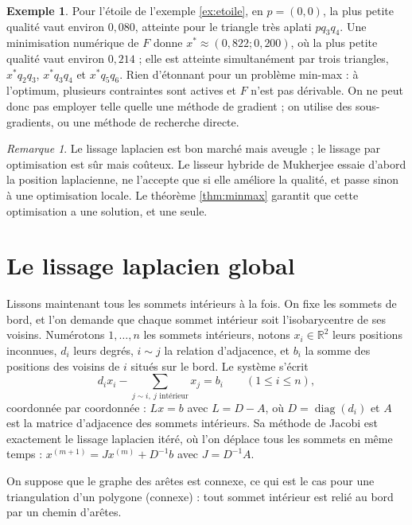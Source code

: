 \documentclass[11pt,a4paper]{article}
\theoremstyle{plain}
\theoremstyle{definition}
\newtheorem{exemple}[theoreme]{Exemple}
\theoremstyle{remark}
\newtheorem{remarque}[theoreme]{Remarque}
\newcommand{\R}{\mathbb{R}}
\begin{document}
\begin{exemple}\label{ex:minmax}
Pour l'étoile de l'exemple \ref{ex:etoile}, en $p=(0,0)$, la plus petite qualité vaut environ $0{,}080$, atteinte pour le triangle très aplati $pq_3q_4$. Une minimisation numérique de $F$ donne $x^*\approx(0{,}822;0{,}200)$, où la plus petite qualité vaut environ $0{,}214$ ; elle est atteinte simultanément par trois triangles, $x^*q_2q_3$, $x^*q_3q_4$ et $x^*q_5q_6$. Rien d'étonnant pour un problème min-max : à l'optimum, plusieurs contraintes sont actives et $F$ n'est pas dérivable. On ne peut donc pas employer telle quelle une méthode de gradient ; on utilise des sous-gradients, ou une méthode de recherche directe.
\end{exemple}

\begin{remarque}
Le lissage laplacien est bon marché mais aveugle ; le lissage par optimisation est sûr mais coûteux. Le lisseur hybride de Mukherjee \cite{mukherjee} essaie d'abord la position laplacienne, ne l'accepte que si elle améliore la qualité, et passe sinon à une optimisation locale. Le théorème \ref{thm:minmax} garantit que cette optimisation a une solution, et une seule.
\end{remarque}

\section{Le lissage laplacien global}

Lissons maintenant tous les sommets intérieurs à la fois. On fixe les sommets de bord, et l'on demande que chaque sommet intérieur soit l'isobarycentre de ses voisins. Numérotons $1,\dots,n$ les sommets intérieurs, notons $x_i\in\R^2$ leurs positions inconnues, $d_i$ leurs degrés, $i\sim j$ la relation d'adjacence, et $b_i$ la somme des positions des voisins de $i$ situés sur le bord. Le système s'écrit
\[
  d_ix_i-\sum_{j\sim i,\ j\text{ intérieur}}x_j=b_i\qquad(1\leq i\leq n),
\]
coordonnée par coordonnée : $Lx=b$ avec $L=D-A$, où $D=\operatorname{diag}(d_i)$ et $A$ est la matrice d'adjacence des sommets intérieurs. Sa méthode de Jacobi est exactement le lissage laplacien itéré, où l'on déplace tous les sommets en même temps : $x^{(m+1)}=Jx^{(m)}+D^{-1}b$ avec $J=D^{-1}A$.

On suppose que le graphe des arêtes est connexe, ce qui est le cas pour une triangulation d'un polygone (connexe) : tout sommet intérieur est relié au bord par un chemin d'arêtes.
\end{document}
